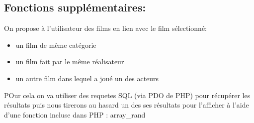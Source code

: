 \documentclass[a4paper, 11pt]{MyReport}
\begin{document}
			\subsection{Fonctions supplémentaires:}

				On propose à l'utilisateur des films en lien avec le film sélectionné:
				\begin{itemize}
					\item un film de même catégorie
					\item un film fait par le même réalisateur
					\item un autre film dans lequel a joué un des acteurs
				\end{itemize}

				POur cela on va utiliser des requetes SQL (via PDO de PHP) pour récupérer les résultats puis nous tirerons au hasard un des ses résultats pour l'afficher à l'aide d'une fonction incluse dans PHP : array\_rand 
\end{document}
